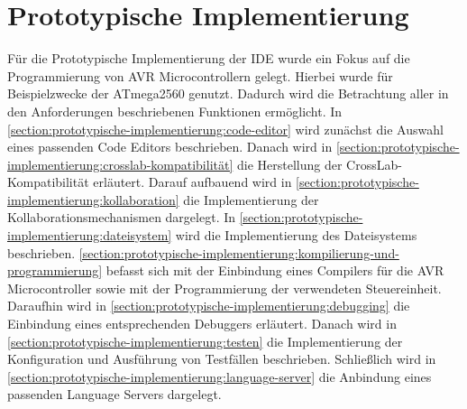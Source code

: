 \chapter{Prototypische Implementierung}\label{section:prototypische-implementierung}

Für die Prototypische Implementierung der IDE wurde ein Fokus auf die Programmierung von AVR Microcontrollern \cite{noauthor_avr_nodate} gelegt. Hierbei wurde für Beispielzwecke der ATmega2560 \cite{noauthor_atmega2560_nodate} genutzt. Dadurch wird die Betrachtung aller in den Anforderungen beschriebenen Funktionen ermöglicht. In \autoref{section:prototypische-implementierung:code-editor} wird zunächst die Auswahl eines passenden Code Editors beschrieben. Danach wird in \autoref{section:prototypische-implementierung:crosslab-kompatibilität} die Herstellung der CrossLab-Kompatibilität erläutert. Darauf aufbauend wird in \autoref{section:prototypische-implementierung:kollaboration} die Implementierung der Kollaborationsmechanismen dargelegt. In \autoref{section:prototypische-implementierung:dateisystem} wird die Implementierung des Dateisystems beschrieben. \autoref{section:prototypische-implementierung:kompilierung-und-programmierung} befasst sich mit der Einbindung eines Compilers für die AVR Microcontroller sowie mit der Programmierung der verwendeten Steuereinheit. Daraufhin wird in \autoref{section:prototypische-implementierung:debugging} die Einbindung eines entsprechenden Debuggers erläutert. Danach wird in \autoref{section:prototypische-implementierung:testen} die Implementierung der Konfiguration und Ausführung von Testfällen beschrieben. Schließlich wird in \autoref{section:prototypische-implementierung:language-server} die Anbindung eines passenden Language Servers dargelegt.









